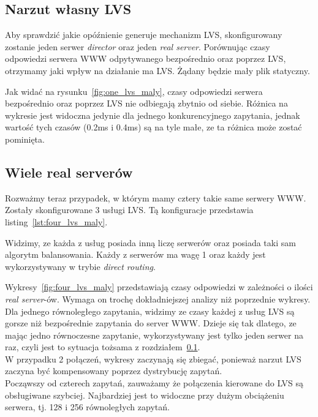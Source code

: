 \subsection{Narzut własny LVS}
\label{sec:lvs_narzut}
Aby sprawdzić jakie opóźnienie generuje mechanizm LVS, skonfigurowany zostanie jeden serwer \textit{director} oraz jeden \textit{real server}.
Porównując czasy odpowiedzi serwera WWW odpytywanego bezpośrednio oraz poprzez LVS, otrzymamy jaki wpływ na działanie ma LVS\@.
Żądany będzie mały plik statyczny.

Jak widać na rysunku~\ref{fig:one_lvs_maly}, czasy odpowiedzi serwera bezpośrednio oraz poprzez LVS nie odbiegają zbytnio od siebie.
Różnica na wykresie jest widoczna jedynie dla jednego konkurencyjnego zapytania, jednak wartość tych czasów (0.2ms i 0.4ms) są na tyle małe, ze ta różnica może zostać pominięta.
\subsection{Wiele real serverów}
Rozważmy teraz przypadek, w którym mamy cztery takie same serwery WWW\@.
Zostały skonfigurowane 3 usługi LVS\@. Tą konfiguracje przedstawia listing~\ref{lst:four_lvs_maly}.
\footnotesize

\normalsize
Widzimy, ze każda z usług posiada inną liczę serwerów oraz posiada taki sam algorytm balansowania.
Każdy z serwerów ma wagę 1 oraz każdy jest wykorzystywany w trybie \textit{direct routing}.

Wykresy~\ref{fig:four_lvs_maly} przedstawiają czasy odpowiedzi w zależności o ilości \textit{real server}-ów.
Wymaga on trochę dokładniejszej analizy niż poprzednie wykresy.
Dla jednego równoległego zapytania, widzimy ze czasy każdej z usług LVS są gorsze niż bezpośrednie zapytania do server WWW\@.
Dzieje się tak dlatego, ze mając jedno równoczesne zapytanie, wykorzystywany jest tylko jeden serwer na raz, czyli jest to sytuacja tożsama z rozdziałem~\ref{sec:lvs_narzut}.\\
W przypadku 2 połączeń, wykresy zaczynają się zbiegać, ponieważ narzut LVS zaczyna być kompensowany poprzez dystrybucję zapytań.\\
Począwszy od czterech zapytań, zauważamy że połączenia kierowane do LVS są obsługiwane szybciej.
Najbardziej jest to widoczne przy dużym obciążeniu serwera, tj. 128 i 256 równoległych zapytań.
